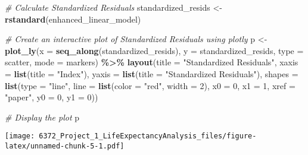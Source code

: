 \documentclass[
]{article}
\newenvironment{Shaded}{\begin{snugshade}}{\end{snugshade}}
\newcommand{\AttributeTok}[1]{\textcolor[rgb]{0.13,0.29,0.53}{#1}}
\newcommand{\CommentTok}[1]{\textcolor[rgb]{0.56,0.35,0.01}{\textit{#1}}}
\newcommand{\DecValTok}[1]{\textcolor[rgb]{0.00,0.00,0.81}{#1}}
\newcommand{\FunctionTok}[1]{\textcolor[rgb]{0.13,0.29,0.53}{\textbf{#1}}}
\newcommand{\NormalTok}[1]{#1}
\newcommand{\OtherTok}[1]{\textcolor[rgb]{0.56,0.35,0.01}{#1}}
\newcommand{\SpecialCharTok}[1]{\textcolor[rgb]{0.81,0.36,0.00}{\textbf{#1}}}
\newcommand{\StringTok}[1]{\textcolor[rgb]{0.31,0.60,0.02}{#1}}
\begin{document}
\begin{Shaded}
\begin{Highlighting}[]
\CommentTok{\# Calculate Standardized Residuals}
\NormalTok{standardized\_resids }\OtherTok{\textless{}{-}} \FunctionTok{rstandard}\NormalTok{(enhanced\_linear\_model)}

\CommentTok{\# Create an interactive plot of Standardized Residuals using plotly}
\NormalTok{p }\OtherTok{\textless{}{-}} \FunctionTok{plot\_ly}\NormalTok{(}\AttributeTok{x =} \FunctionTok{seq\_along}\NormalTok{(standardized\_resids), }\AttributeTok{y =}\NormalTok{ standardized\_resids, }\AttributeTok{type =} \StringTok{\textquotesingle{}scatter\textquotesingle{}}\NormalTok{, }\AttributeTok{mode =} \StringTok{\textquotesingle{}markers\textquotesingle{}}\NormalTok{) }\SpecialCharTok{\%\textgreater{}\%}
  \FunctionTok{layout}\NormalTok{(}\AttributeTok{title =} \StringTok{"Standardized Residuals"}\NormalTok{,}
         \AttributeTok{xaxis =} \FunctionTok{list}\NormalTok{(}\AttributeTok{title =} \StringTok{"Index"}\NormalTok{),}
         \AttributeTok{yaxis =} \FunctionTok{list}\NormalTok{(}\AttributeTok{title =} \StringTok{"Standardized Residuals"}\NormalTok{),}
         \AttributeTok{shapes =} \FunctionTok{list}\NormalTok{(}\AttributeTok{type =} \StringTok{"line"}\NormalTok{, }\AttributeTok{line =} \FunctionTok{list}\NormalTok{(}\AttributeTok{color =} \StringTok{"red"}\NormalTok{, }\AttributeTok{width =} \DecValTok{2}\NormalTok{), }\AttributeTok{x0 =} \DecValTok{0}\NormalTok{, }\AttributeTok{x1 =} \DecValTok{1}\NormalTok{, }\AttributeTok{xref =} \StringTok{"paper"}\NormalTok{, }\AttributeTok{y0 =} \DecValTok{0}\NormalTok{, }\AttributeTok{y1 =} \DecValTok{0}\NormalTok{))}

\CommentTok{\# Display the plot}
\NormalTok{p}
\end{Highlighting}
\end{Shaded}

\texttt{[image: 6372\_Project\_1\_LifeExpectancyAnalysis\_files/figure-latex/unnamed-chunk-5-1.pdf]}
\end{document}
